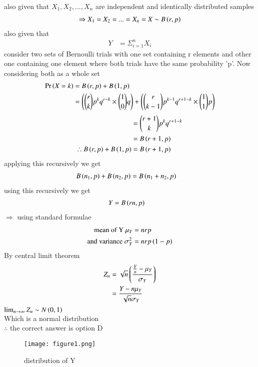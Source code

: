 \documentclass[journal,12pt,twocolumn]{IEEEtran}
\begin{document}
also given that $X_1,X_2,...,X_n$ are independent and identically distributed samples 
\begin{align}
    \Rightarrow X_1=X_2=...=X_n=X \sim B\left(r,p\right)
\end{align}
also given that
\begin{align}
Y&=\Sigma_{i=1}^n X_i
\end{align}
consider two sets of Bernoulli trials with one set containing r elements and other one containing one element where both trials have the same probability 'p'. Now considering both as a whole set
\begin{align}
\Pr\left(X=k\right)&=B\left(r,p\right)+B\left(1,p\right)\\
&=\left(\binom{r}{k}p^k q^{r-k}\times\binom{1}{0}q\right)+ \left(\binom{r}{k-1}p^{k-1} q^{r+1-k} \times \binom{1}{1} p\right)\nonumber
\end{align}
\begin{align}
&=\binom{r+1}{k}p^{k} q^{r+1-k}\nonumber\\
&=B\left(r+1,p\right)\nonumber\\
\therefore B\left(r,p\right)+B\left(1,p\right)&=B\left(r+1,p\right)
\end{align}
applying this recursively we get
\begin{align}
    B\left(n_1,p\right)+B\left(n_2,p\right)&=B\left(n_1 +n_2,p\right)
\end{align}
using this recursively we get
\begin{align}
    Y&=B\left(r n,p\right)
\end{align}
$\Rightarrow$ using standard formulae
\begin{align}
\text{mean of Y } \mu_Y&=nrp \nonumber\\
\text{and variance } \sigma^2_Y&=nrp\left(1-p\right)
\end{align}
By central limit theorem
\begin{align}
    Z_n &= \sqrt{n}\left(\frac{\frac{Y}{n} - \mu_Y}{\sigma_Y}\right)\nonumber\\
    &=\frac{Y-n \mu_Y}{\sqrt{n} \sigma_Y}
\end{align}
$\lim_{n \rightarrow \infty} Z_n \sim N\left(0,1\right)$ \\
Which is a normal distribution\\
$\therefore$ the correct answer is option D
\begin{figure}[p!]
    \centering
    \texttt{[image: figure1.png]}
    \caption{distribution of Y}
    \label{fig:my_label}
\end{figure}
\end{document}
